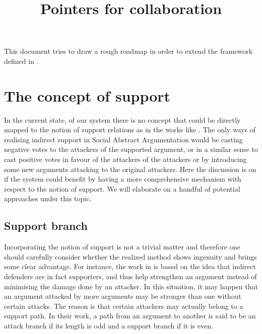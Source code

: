 \documentclass{article}
\begin{document}
\title{Pointers for collaboration}

\maketitle

This document tries to draw a rough roadmap in order to extend the framework defined in \cite{leite2011social}.
\\
\section{The concept of support} 



In the current state, of our system there is no concept that could be directly mapped to the notion of support relations as in the works like \cite{DBLP:journals/ijis/AmgoudCLL08}. The only ways of realising indirect support in Social Abstract Argumentation would be casting negative votes to the attackers of the supported argument, or in a similar sense to cast positive votes in favour of the attackers of the attackers or by introducing some new arguments attacking to the original attackers. Here the discussion is on if the system could benefit by having a more comprehensive mechanism with respect to the notion of support. We will elaborate on a handful of potential approaches under this topic.

\subsection{Support branch}
Incorporating the notion of support is not a trivial matter and therefore one should carefully consider whether the realized method shows ingenuity and brings some clear advantage. 
For instance, the work in \cite{gradinarg} is based on the idea that indirect defenders are in fact supporters, and thus help strengthen an argument instead of minimising the damage done by an attacker. In this situation, it may happen that an argument attacked by more arguments may be stronger than one without certain attacks. The reason is that certain attackers may actually belong to a support path. In their work, a path from an argument to another is said to be an attack branch if its length is odd and a support branch if it is even. 
\end{document}
